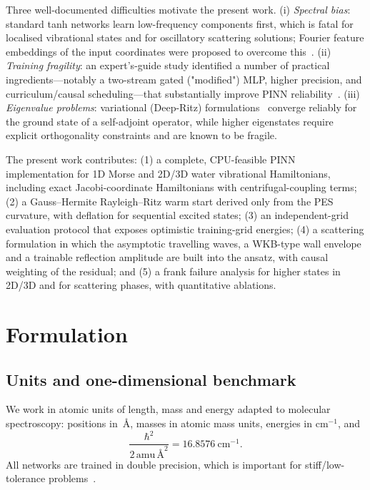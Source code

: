\documentclass[11pt,a4paper]{article}
\newcommand{\cmi}{\ensuremath{\mathrm{cm}^{-1}}}
\begin{document}
Three well-documented difficulties motivate the present work. (i) \emph{Spectral
bias}: standard tanh networks learn low-frequency components first, which is
fatal for localised vibrational states and for oscillatory scattering solutions;
Fourier feature embeddings of the input coordinates were proposed to overcome
this~\cite{tancik2021}. (ii) \emph{Training fragility}: an expert's-guide study
identified a number of practical ingredients---notably a two-stream gated
("modified") MLP, higher precision, and curriculum/causal scheduling---that
substantially improve PINN reliability~\cite{wang2023guide}. (iii)
\emph{Eigenvalue problems}: variational (Deep-Ritz) formulations~\cite{li2021}
converge reliably for the ground state of a self-adjoint operator, while higher
eigenstates require explicit orthogonality constraints and are known to be
fragile.

The present work contributes: (1) a complete, CPU-feasible PINN implementation
for 1D Morse and 2D/3D water vibrational Hamiltonians, including exact
Jacobi-coordinate Hamiltonians with centrifugal-coupling terms; (2) a
Gauss--Hermite Rayleigh--Ritz warm start derived only from the PES curvature,
with deflation for sequential excited states; (3) an independent-grid
evaluation protocol that exposes optimistic training-grid energies; (4) a
scattering formulation in which the asymptotic travelling waves, a WKB-type
wall envelope and a trainable reflection amplitude are built into the ansatz,
with causal weighting of the residual; and (5) a frank failure analysis for
higher states in 2D/3D and for scattering phases, with quantitative ablations.

\section{Formulation}

\subsection{Units and one-dimensional benchmark}

We work in atomic units of length, mass and energy adapted to molecular
spectroscopy: positions in~\AA, masses in atomic mass units, energies in
cm$^{-1}$, and
\begin{equation}
 \frac{\hbar^2}{2\,\mathrm{amu}\,\text{\AA}^2} = 16.8576\ \cmi{} .
\end{equation}
All networks are trained in double precision, which is important for
stiff/low-tolerance problems~\cite{wang2023guide}.
\end{document}
